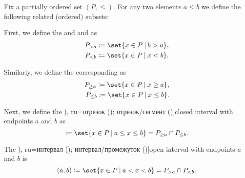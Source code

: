 \begin{definition}\label{def:order_interval}
  Fix a \hyperref[def:partially_ordered_set]{partially ordered set} \( (P, \leq) \). For any two elements \( a \leq b \) we define the following related (ordered) subsets:

  \begin{thmenum}
     First, we define the  and  and as
    \begin{equation*}
      \begin{aligned}
        P_{>a} \coloneqq \set{ x \in P \given b > a },
        \\
        P_{<b} \coloneqq \set{ x \in P \given x < b }.
      \end{aligned}
    \end{equation*}

    Similarly, we define the corresponding  as
    \begin{equation*}
      \begin{aligned}
        P_{\geq a} \coloneqq \set{ x \in P \given x \geq a },
        \\
        P_{\leq b} \coloneqq \set{ x \in P \given x \leq b }.
      \end{aligned}
    \end{equation*}

     Next, we define the \term[bg=затворен интервал (\cite[39]{Тагамлицки1971ДиференциалноСмятане}), ru=отрезок (\cite[82]{АлександровМаркушевичХинчинИПр1951ЭнциклопедияТом1}); отрезок/сегмент (\cite[def. 6]{Александров1977ОбщаяТопология})]{closed interval} with endpoints \( a \) and \( b \) as
    \begin{equation*}
      [a, b] \coloneqq \set{ x \in P \given a \leq x \leq b } = P_{\geq a} \cap P_{\leq b}.
    \end{equation*}

     The \term[bg=отворен интервал (\cite[39]{Тагамлицки1971ДиференциалноСмятане}), ru=интервал (\cite[82]{АлександровМаркушевичХинчинИПр1951ЭнциклопедияТом1}); интервал/промежуток (\cite[def. 6]{Александров1977ОбщаяТопология})]{open interval} with endpoints \( a \) and \( b \) is
    \begin{equation*}
      (a, b) \coloneqq \set{ x \in P \given a < x < b } = P_{> a} \cap P_{< b}.
    \end{equation*}


\end{thmenum}
\end{definition}
